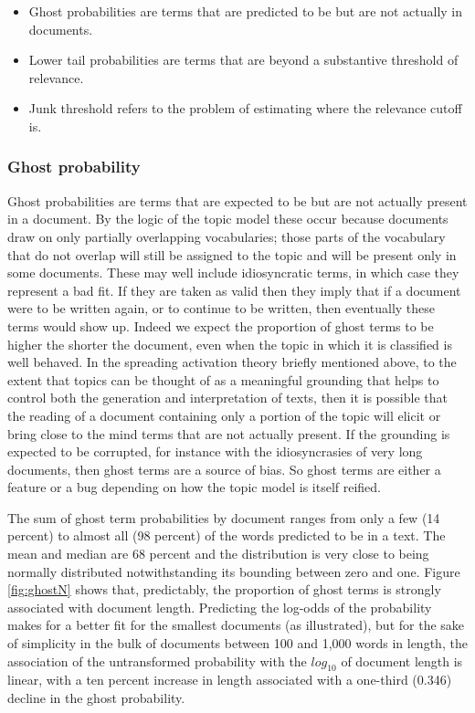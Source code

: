 \documentclass[]{book}
\providecommand{\tightlist}{%
  \setlength{\itemsep}{0pt}\setlength{\parskip}{0pt}}
\theoremstyle{definition}
\theoremstyle{definition}
\theoremstyle{definition}
\theoremstyle{remark}
\begin{document}
\begin{itemize}
\tightlist
\item
  Ghost probabilities are terms that are predicted to be but are not
  actually in documents.
\item
  Lower tail probabilities are terms that are beyond a substantive
  threshold of relevance.
\item
  Junk threshold refers to the problem of estimating where the relevance
  cutoff is.
\end{itemize}

\hypertarget{ghost-probability}{%
\subsubsection{Ghost probability}\label{ghost-probability}}

Ghost probabilities are terms that are expected to be but are not
actually present in a document. By the logic of the topic model these
occur because documents draw on only partially overlapping vocabularies;
those parts of the vocabulary that do not overlap will still be assigned
to the topic and will be present only in some documents. These may well
include idiosyncratic terms, in which case they represent a bad fit. If
they are taken as valid then they imply that if a document were to be
written again, or to continue to be written, then eventually these terms
would show up. Indeed we expect the proportion of ghost terms to be
higher the shorter the document, even when the topic in which it is
classified is well behaved. In the spreading activation theory briefly
mentioned above, to the extent that topics can be thought of as a
meaningful grounding that helps to control both the generation and
interpretation of texts, then it is possible that the reading of a
document containing only a portion of the topic will elicit or bring
close to the mind terms that are not actually present. If the grounding
is expected to be corrupted, for instance with the idiosyncrasies of
very long documents, then ghost terms are a source of bias. So ghost
terms are either a feature or a bug depending on how the topic model is
itself reified.

The sum of ghost term probabilities by document ranges from only a few
(14 percent) to almost all (98 percent) of the words predicted to be in
a text. The mean and median are 68 percent and the distribution is very
close to being normally distributed notwithstanding its bounding between
zero and one. Figure \ref{fig:ghostN} shows that, predictably, the
proportion of ghost terms is strongly associated with document length.
Predicting the log-odds of the probability makes for a better fit for
the smallest documents (as illustrated), but for the sake of simplicity
in the bulk of documents between 100 and 1,000 words in length, the
association of the untransformed probability with the \(log_{10}\) of
document length is linear, with a ten percent increase in length
associated with a one-third (0.346) decline in the ghost probability.
\end{document}
